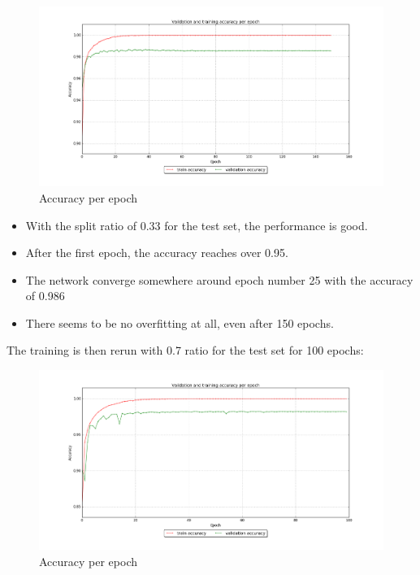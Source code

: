 \documentclass[paper=a4, fontsize=11pt]{scrartcl} %
\begin{document}
    \begin{figure}[H]
        \begin{center}
            \includegraphics[width=1.0\linewidth]{images/mnist_training_log.png}
            \caption{Accuracy per epoch}
            \label{fig:train}
        \end{center}
    \end{figure}
    \begin{itemize}
        \item With the split ratio of 0.33 for the test set, the performance is good.
        \item After the first epoch, the accuracy reaches over 0.95.
        \item The network converge somewhere around epoch number 25 with the accuracy of 0.986
        \item There seems to be no overfitting at all, even after 150 epochs.
    \end{itemize}

    The training is then rerun with 0.7 ratio for the test set for 100 epochs:
    \begin{figure}[H]
        \begin{center}
            \includegraphics[width=1.0\linewidth]{images/mnist_training_log_more_test.png}
            \caption{Accuracy per epoch}
            \label{fig:train_more_test}
        \end{center}
    \end{figure}
\end{document}
